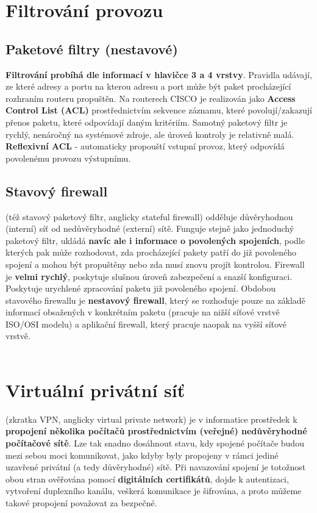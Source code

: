 \section{Filtrování provozu}
\subsection{Paketové filtry (nestavové)}
\textbf{Filtrování probíhá dle informací v hlavičce 3 a 4 vrstvy}. Pravidla udávají, ze které adresy a portu na kterou adresu a port může být paket procházející rozhraním routeru propuštěn. Na routerech CISCO je realizován jako \textbf{Access Control List (ACL)} prostřednictvím sekvence záznamu, které povolují/zakazují přenos paketu, které odpovídají daným kritériím. Samotný paketový filtr je rychlý, nenáročný na systémové zdroje, ale úroveň kontroly je relativně malá. \textbf{Reflexivní ACL} - automaticky propouští vstupní provoz, který odpovídá povolenému provozu výstupnímu.

\subsection{Stavový firewall}
(též stavový paketový filtr, anglicky stateful firewall) odděluje důvěryhodnou (interní) síť od nedůvěryhodné (externí) sítě. Funguje stejně jako jednoduchý paketový filtr, ukládá \textbf{navíc ale i informace o povolených spojeních}, podle kterých pak může rozhodovat, zda procházející pakety patří do již povoleného spojení a mohou být propuštěny nebo zda musí znovu projít kontrolou. Firewall je \textbf{velmi rychlý}, poskytuje slušnou úroveň zabezpečení a snazší konfiguraci.  Poskytuje urychlené zpracování paketu již povoleného spojení. Obdobou stavového firewallu je \textbf{nestavový firewall}, který se rozhoduje pouze na základě informací obsažených v konkrétním paketu (pracuje na nižší síťové vrstvě ISO/OSI modelu) a aplikační firewall, který pracuje naopak na vyšší síťové vrstvě.
\\\\
\noindent{}

\section{Virtuální privátní síť }
 (zkratka VPN, anglicky virtual private network) je v informatice prostředek k \textbf{propojení několika počítačů prostřednictvím (veřejné) nedůvěryhodné počítačové sítě}. Lze tak snadno dosáhnout stavu, kdy spojené počítače budou mezi sebou moci komunikovat, jako kdyby byly propojeny v rámci jediné uzavřené privátní (a tedy důvěryhodné) sítě. Při navazování spojení je totožnost obou stran ověřována pomocí \textbf{digitálních certifikátů}, dojde k autentizaci, vytvoření duplexního kanálu, veškerá komunikace je šifrována, a proto můžeme takové propojení považovat za bezpečné.

